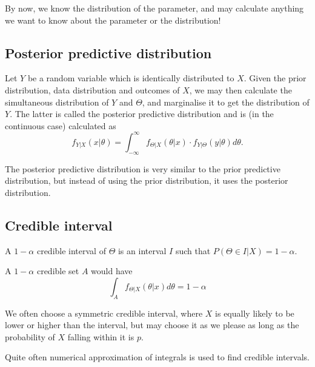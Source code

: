 By now, we know the distribution of the parameter, and may calculate anything we want to know about the parameter or the distribution!

\subsection{Posterior predictive distribution}
\begin{definition}
	Let \(Y\) be a random variable which is identically distributed to \(X\). Given the prior distribution, data distribution and outcomes of \(X\), we may then calculate the simultaneous distribution of \(Y\) and \(\Theta \), and marginalise it to get the distribution of \(Y\). The latter is called the posterior predictive distribution and is (in the continuous case) calculated as
	\[
		f _{Y|X}(x|\theta ) = \int_{-\infty }^{\infty} f _{\Theta |X}(\theta|x )  \cdot f _{Y|\Theta }(y|\theta ) d \theta.
	\]
\end{definition}

\begin{obs}
	The posterior predictive distribution is very similar to the prior predictive distribution, but instead of using the prior distribution, it uses the posterior distribution.
\end{obs}

\subsection{Credible interval}


\begin{definition}
	A \(1-\alpha \)  credible interval of \(\Theta\) is an interval \(I\) such that \(P(\Theta  \in I| X) = 1-\alpha \). 
\end{definition}

\begin{example}
	A \(1- \alpha \) credible set \(A\) would have
	\[
		\int_{A} f _{\Theta |X}(\theta |x) d \theta  = 1-\alpha 
	\]
\end{example}


\begin{obs}
	We often choose a symmetric credible interval, where \(X\) is equally likely to be lower or higher than the interval, but may choose it as we please as long as the probability of \(X\) falling within it is \(p\).
\end{obs}

\begin{obs}
	Quite often numerical approximation of integrals is used to find credible intervals.
\end{obs}

